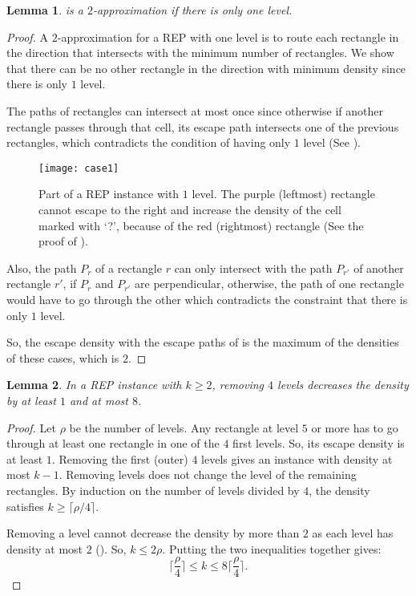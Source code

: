 \documentclass[preprint,12pt]{elsarticle}
\newtheorem{lemma}{Lemma}
\begin{document}
\begin{lemma}\label{theorem:f}
 is a $2$-approximation if there is only one level.
\end{lemma}
\begin{proof}
A $2$-approximation for a REP with one level is to route each rectangle in the direction that intersects with the minimum number of rectangles.
We show that there can be no other rectangle in the direction with minimum density since there is only $1$ level.

The paths of rectangles can intersect at most once since otherwise if another rectangle passes through that cell, its escape path intersects one of the previous rectangles, which contradicts the condition of having only $1$ level (See ).

\begin{figure}[h]
\centering
\texttt{[image: case1]}
\caption{Part of a REP instance with $1$ level. The purple (leftmost) rectangle cannot escape to the right and increase the density of the cell marked with `?', because of the red (rightmost) rectangle (See the proof of ).}
\label{fig:case1}
\end{figure}

Also, the path $P_r$ of a rectangle $r$ can only intersect with the path $P_{r'}$ of another rectangle $r'$, if $P_r$ and $P_{r'}$ are perpendicular, otherwise, the path of one rectangle would have to go through the other which contradicts the constraint that there is only $1$ level.
%

So, the escape density with the escape paths of  is the maximum of the densities of these cases, which is $2$.
\end{proof}


\begin{lemma}\label{lemma:add}
In a REP instance with $k\geq 2$, removing $4$ levels decreases the density by at least $1$ and at most $8$.
\end{lemma}
\begin{proof}
Let $\rho$ be the number of levels.
Any rectangle at level $5$ or more has to go through at least one rectangle in one of the $4$ first levels. So, its escape density is at least $1$. Removing the first (outer) $4$ levels gives an instance with density at most $k-1$.
Removing levels does not change the level of the remaining rectangles.
By induction on the number of levels divided by $4$, the density satisfies $k\geq \lceil \rho/4\rceil$.

Removing a level cannot decrease the density by more than $2$ as each level has density at most $2$ (). So, $k\leq 2\rho$. Putting the two inequalities together gives:
\[
\lceil \frac{\rho}{4}\rceil \leq k \leq 8\lceil \frac{\rho}{4} \rceil.
\]
\end{proof}
\end{document}

